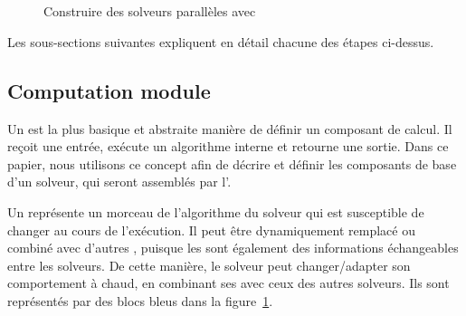 \documentclass{jfpc-preprint}
\begin{document}
\begin{figure}
	\centering
	\\
	\\
	\caption[]{Construire des solveurs parallèles avec \posl{}}
	\label{fig:posl}
\end{figure}%

Les sous-sections suivantes expliquent en détail chacune des étapes ci-dessus.

\subsection{Computation module}

Un \om{}  est la plus basique  et abstraite manière de  définir un composant de calcul. Il reçoit une entrée, exécute un algorithme interne et retourne une sortie. Dans ce papier, nous utilisons ce concept afin de décrire et  définir les composants de base d'un  solveur, qui seront assemblés par l'\as.  

Un \om{} représente un  morceau de l'algorithme  du solveur  qui est susceptible de changer au cours de  l'exécution.   Il  peut  être
dynamiquement remplacé  ou combiné avec d'autres  \oms, puisque les \oms{}  sont  également  des   informations  échangeables  entre  les
solveurs. De  cette manière,  le  solveur  peut changer/adapter  son comportement à  chaud, en combinant  ses \oms{} avec ceux  des autres solveurs. Ils sont  représentés par  des blocs  bleus dans  la figure~\ref{fig:posl}.
\end{document}
